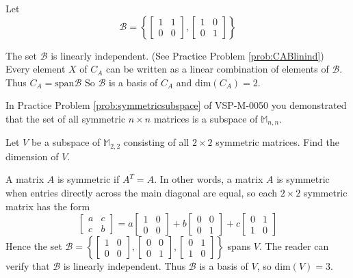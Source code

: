 \documentclass{ximera}
\begin{document}
\begin{example}
\begin{explanation}
Let 
$$\mathcal{B}=\left\{\begin{bmatrix}1&1\\0&0\end{bmatrix},\begin{bmatrix}1&0\\0&1\end{bmatrix}\right\}$$

The set $\mathcal{B}$ is linearly independent. (See Practice Problem \ref{prob:CABlinind}) Every element $X$ of $C_A$ can be written as a linear combination of elements of $\mathcal{B}$.  Thus $C_A=\mbox{span}\mathcal{B}$
 So $\mathcal{B}$ is a basis of $C_A$ and $\mbox{dim}(C_A) = 2$.
\end{explanation}
\end{example}

\begin{example}\label{ex:symmetricmatsubspace} 
In Practice Problem \ref{prob:symmetricsubspace} of VSP-M-0050 you demonstrated that the set of all symmetric $n\times n$ matrices is a subspace of $\mathbb{M}_{n,n}$.

Let $V$ be a subspace of $\mathbb{M}_{2,2}$ consisting of all $2\times 2$ symmetric matrices.  Find the dimension of $V$.

\begin{explanation}
A matrix $A$ is symmetric if $A^{T} = A$. In other words, a matrix $A$ is symmetric when entries directly across the main diagonal are equal, so each $2 \times 2$ symmetric matrix has the form
$$
\begin{bmatrix}
a & c \\
c & b
\end{bmatrix}
= a\begin{bmatrix}
1 & 0 \\
0 & 0
\end{bmatrix}
+ b\begin{bmatrix}
0 & 0 \\
0 & 1
\end{bmatrix}
+ c\begin{bmatrix}
0 & 1 \\
1 & 0
\end{bmatrix}
$$
Hence the set 
$\mathcal{B} = \left\{
\begin{bmatrix}
1 & 0 \\
0 & 0
\end{bmatrix}, \begin{bmatrix}
0 & 0 \\
0 & 1
\end{bmatrix}, \begin{bmatrix}
0 & 1 \\
1 & 0
\end{bmatrix}
\right\}$
 spans $V$. The reader can verify that $\mathcal{B}$ is linearly independent. Thus $\mathcal{B}$ is a basis of $V$, so $\mbox{dim}(V) = 3$.
\end{explanation}
\end{example}
\end{document}
